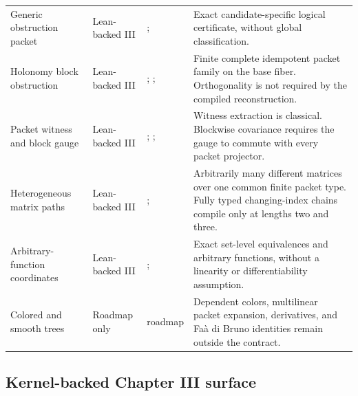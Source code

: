 \begin{longtable}{L{0.17\textwidth}L{0.18\textwidth}L{0.25\textwidth}L{0.22\textwidth}}
\addlinespace
Generic obstruction packet
& Lean-backed III
& ; 
& Exact candidate-specific logical certificate, without global classification.\\
\addlinespace
Holonomy block obstruction
& Lean-backed III
& ; ; 
& Finite complete idempotent packet family on the base fiber. Orthogonality is not required by the compiled reconstruction.\\
\addlinespace
Packet witness and block gauge
& Lean-backed III
& ; ; 
& Witness extraction is classical. Blockwise covariance requires the gauge to commute with every packet projector.\\
\addlinespace
Heterogeneous matrix paths
& Lean-backed III
& ; 
& Arbitrarily many different matrices over one common finite packet type. Fully typed changing-index chains compile only at lengths two and three.\\
\addlinespace
Arbitrary-function coordinates
& Lean-backed III
& ; 
& Exact set-level equivalences and arbitrary functions, without a linearity or differentiability assumption.\\
\addlinespace
Colored and smooth trees
& Roadmap only
& roadmap 
& Dependent colors, multilinear packet expansion, derivatives, and Fa\`a di Bruno identities remain outside the contract.\\
\bottomrule
\end{longtable}
\normalsize

\subsection{Kernel-backed Chapter III surface}

